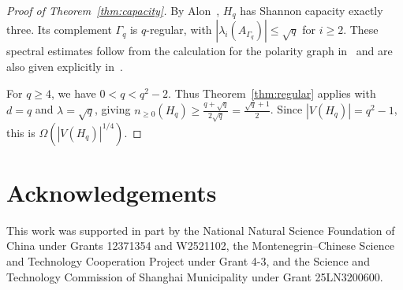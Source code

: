 \documentclass[11pt]{article}
\numberwithin{equation}{section}
\theoremstyle{definition}
\theoremstyle{remark}
\begin{document}
\begin{proof}[Proof of Theorem~\ref{thm:capacity}]
By Alon~\cite[Theorem~3.2]{Alon2019}, $H_q$ has Shannon capacity
exactly three. Its complement $\Gamma_q$ is $q$-regular, with
$|\lambda_i(A_{\Gamma_q})|\leq\sqrt q$ for $i\geq2$.
These spectral estimates follow from the calculation for the
polarity graph in~\cite[proof of Claim~3.4]{Alon2019} and are
also given explicitly in~\cite[proof of Theorem~1.8]{TZE}.

For $q\geq4$, we have $0<q<q^2-2$.
Thus Theorem~\ref{thm:regular} applies with
$d=q$ and $\lambda=\sqrt q$, giving
$n_{\geq0}(H_q) \geq\frac{q+\sqrt q}{2\sqrt q} =\frac{\sqrt q+1}{2}$.
Since $|V(H_q)|=q^2-1$, this is
$\Omega(|V(H_q)|^{1/4})$.
\end{proof}


\section*{Acknowledgements}

This work was supported in part by the National Natural Science
Foundation of China under Grants 12371354 and W2521102, the
Montenegrin--Chinese Science and Technology Cooperation Project
under Grant 4-3, and the Science and Technology Commission of
Shanghai Municipality under Grant 25LN3200600.
\end{document}

